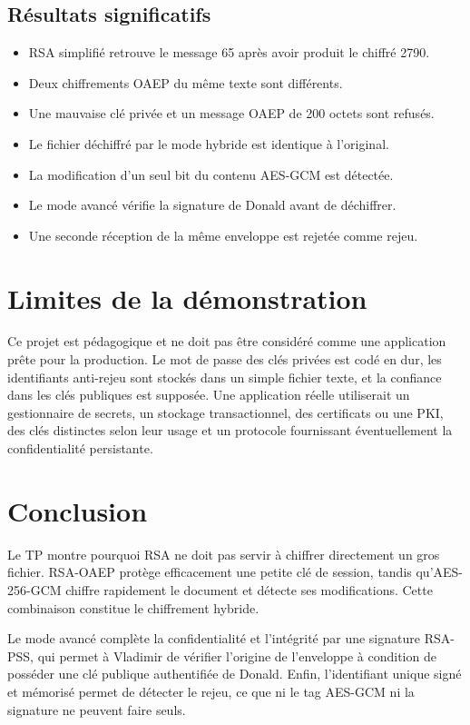\documentclass[11pt,a4paper]{article}
\begin{document}
\subsection{Résultats significatifs}

\begin{itemize}
    \item RSA simplifié retrouve le message 65 après avoir produit le chiffré 2790.
    \item Deux chiffrements OAEP du même texte sont différents.
    \item Une mauvaise clé privée et un message OAEP de 200 octets sont refusés.
    \item Le fichier déchiffré par le mode hybride est identique à l'original.
    \item La modification d'un seul bit du contenu AES-GCM est détectée.
    \item Le mode avancé vérifie la signature de Donald avant de déchiffrer.
    \item Une seconde réception de la même enveloppe est rejetée comme rejeu.
\end{itemize}

\section{Limites de la démonstration}

Ce projet est pédagogique et ne doit pas être considéré comme une application prête
pour la production. Le mot de passe des clés privées est codé en dur, les identifiants
anti-rejeu sont stockés dans un simple fichier texte, et la confiance dans les clés
publiques est supposée. Une application réelle utiliserait un gestionnaire de secrets,
un stockage transactionnel, des certificats ou une PKI, des clés distinctes selon leur
usage et un protocole fournissant éventuellement la confidentialité persistante.

\section{Conclusion}

Le TP montre pourquoi RSA ne doit pas servir à chiffrer directement un gros fichier.
RSA-OAEP protège efficacement une petite clé de session, tandis qu'AES-256-GCM chiffre
rapidement le document et détecte ses modifications. Cette combinaison constitue le
chiffrement hybride.

Le mode avancé complète la confidentialité et l'intégrité par une signature RSA-PSS,
qui permet à Vladimir de vérifier l'origine de l'enveloppe à condition de posséder une
clé publique authentifiée de Donald. Enfin, l'identifiant unique signé et mémorisé
permet de détecter le rejeu, ce que ni le tag AES-GCM ni la signature ne peuvent faire
seuls.
\end{document}
